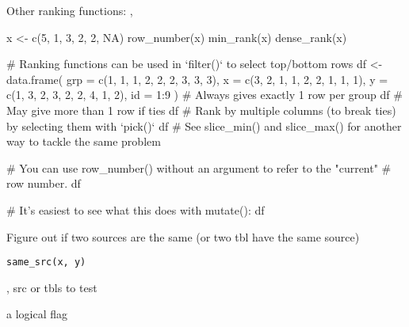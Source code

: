 \documentclass[a4paper]{book}
\begin{document}
%
\begin{SeeAlso}
Other ranking functions: 
,
\end{SeeAlso}
%
\begin{Examples}
\begin{ExampleCode}
x <- c(5, 1, 3, 2, 2, NA)
row_number(x)
min_rank(x)
dense_rank(x)

# Ranking functions can be used in `filter()` to select top/bottom rows
df <- data.frame(
  grp = c(1, 1, 1, 2, 2, 2, 3, 3, 3),
  x = c(3, 2, 1, 1, 2, 2, 1, 1, 1),
  y = c(1, 3, 2, 3, 2, 2, 4, 1, 2),
  id = 1:9
)
# Always gives exactly 1 row per group
df %
# May give more than 1 row if ties
df %
# Rank by multiple columns (to break ties) by selecting them with `pick()`
df %
# See slice_min() and slice_max() for another way to tackle the same problem

# You can use row_number() without an argument to refer to the "current"
# row number.
df %

# It's easiest to see what this does with mutate():
df %
\end{ExampleCode}
\end{Examples}
%
\begin{Description}
Figure out if two sources are the same (or two tbl have the same source)
\end{Description}
%
\begin{Usage}
\begin{verbatim}
same_src(x, y)
\end{verbatim}
\end{Usage}
%
\begin{Arguments}
\begin{ldescription}
\item[\code{x}, \code{y}] src or tbls to test
\end{ldescription}
\end{Arguments}
%
\begin{Value}
a logical flag
\end{Value}
\end{document}
